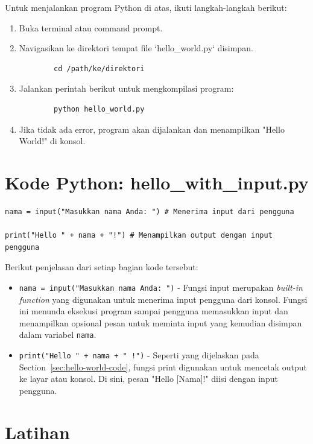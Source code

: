 Untuk menjalankan program Python di atas, ikuti langkah-langkah berikut:

\begin{enumerate}
	\item Buka terminal atau command prompt.
	\item Navigasikan ke direktori tempat file `hello_world.py` disimpan.
	\begin{verbatim}
		cd /path/ke/direktori
	\end{verbatim}
	\item Jalankan perintah berikut untuk mengkompilasi program:
	\begin{verbatim}
		python hello_world.py
	\end{verbatim}
	\item Jika tidak ada error, program akan dijalankan dan menampilkan "Hello World!" di konsol.
\end{enumerate}

\section{Kode Python: hello_with_input.py}

\begin{lstlisting}[style=PythonStyle, caption={Kode Python: hello_with_input.py}]
nama = input("Masukkan nama Anda: ") # Menerima input dari pengguna

print("Hello " + nama + "!") # Menampilkan output dengan input pengguna
\end{lstlisting}

Berikut penjelasan dari setiap bagian kode tersebut:

\begin{itemize}
\item \texttt{nama = input("Masukkan nama Anda: ")} - Fungsi input merupakan \textit{built-in function} yang digunakan untuk menerima input pengguna dari konsol. Fungsi ini menunda eksekusi program sampai pengguna memasukkan input dan menampilkan opsional pesan untuk meminta input yang kemudian disimpan dalam variabel \texttt{nama}.
\item \texttt{print("Hello " + nama + " !")} - Seperti yang dijelaskan pada Section~\ref{sec:hello-world-code}, fungsi print digunakan untuk mencetak output ke layar atau konsol. Di sini, pesan "Hello [Nama]!" diisi dengan input pengguna.
\end{itemize}


\section{Latihan}

